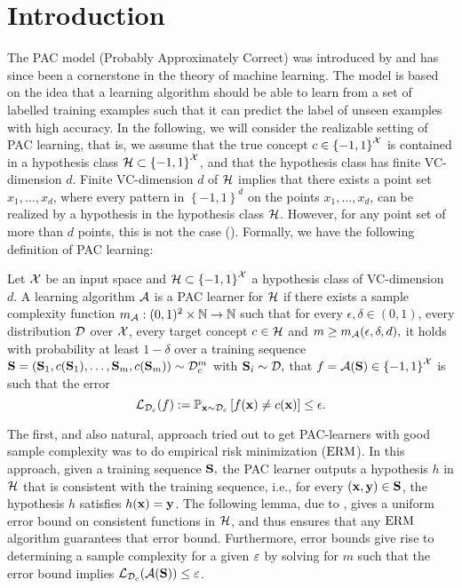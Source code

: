 

\section{Introduction}
The PAC model (Probably Approximately Correct) was introduced by \cite{valiant1984theory,vapnik1964class,vapnik74theory} and has since been a cornerstone in the theory of machine learning. The model is based on the idea that a learning algorithm should be able to learn from a set of labelled training examples such that it can predict the label of unseen examples with high accuracy. In the following, we will consider the realizable setting of PAC learning, that is, we assume that the true concept $ c\in\left\{ -1,1 \right\}^{\mathcal{X}} $  is contained in a hypothesis class $ \mathcal{H} \subset \left\{ -1,1 \right\}^{\mathcal{X}}$, and that the hypothesis class has finite VC-dimension $ d $. Finite VC-dimension $ d $ of $ \mathcal{H} $ implies that there exists a point set $ x_1,\ldots,x_{d} $, where every pattern in $ \left\{ -1,1 \right\}^{d} $ on the points $ x_{1},\ldots,x_{d} $, can be realized by a hypothesis in the hypothesis class $ \mathcal{H} $. However, for any point set of more than $ d $ points, this is not the case (\cite{vapnik1971uniform}). Formally, we have the following definition of PAC learning:
\begin{definition}
    Let $\mathcal{X}$ be an input space and $\mathcal{H}\subset \left\{ -1,1 \right\}^{\mathcal{X}}$ a hypothesis class of VC-dimension $ d.$ A learning algorithm $\mathcal{A}$ is a PAC learner for $\mathcal{H}$ if there exists a sample complexity function $m_{\mathcal{A}}:(0,1)^{2}\times \mathbb{N}\rightarrow\mathbb{N}$ such that for every $\epsilon,\delta\in(0,1)$, every distribution $\mathcal{D}$ over $\mathcal{X}$, every target concept $ c\in \mathcal{H} $ and $m\geq m_{\mathcal{A}}(\epsilon,\delta,d),$ it holds with probability at least $1-\delta$ over a training sequence $\mathbf{S}=(\mathbf{S}_1,c(\mathbf{S}_1),\ldots,\mathbf{S}_{m},c(\mathbf{S}_{m}))\sim\mathcal{D}_{c}^{m}$ with $\mathbf{S}_{i} \sim\mathcal{D} ,$ that $ f=\mathcal{A}(\mathbf{S}) \in\left\{ -1,1 \right\}^{\mathcal{X}}$ is such that the error $$\operatorname{\mathcal{L}}_{\mathcal{D}_{c}}(f):=\mathbb{P}_{\mathbf{x}\sim \mathcal{D}_{c}}\left[f(\mathbf{x})\not=c(\mathbf{x})\right]\leq\epsilon.$$
\end{definition}
The first, and also natural, approach tried out to get PAC-learners with good sample complexity was to do empirical risk minimization ($\mathrm{ERM}$). In this approach, given a training sequence $   \mathbf{S}, $ the PAC learner outputs a hypothesis $ h $  in $ \mathcal{H} $ that is consistent with the training sequence, i.e., for every $ (\mathbf{x},\mathbf{y})\in \mathbf{S} $, the hypothesis $ h $ satisfies $ h(\mathbf{x})=\mathbf{y} $. The following lemma, due to \cite{vapnik1968algorithms,vapnik1971uniform,blumer1989learnability}, gives a uniform error bound on consistent functions in $ \mathcal{H}$, and thus ensures that any $ \mathrm{ERM} $ algorithm guarantees that error bound. Furthermore, error bounds give rise to determining a sample complexity for a given $ \varepsilon $ by solving for $ m $ such that the error bound implies $ \operatorname{\mathcal{L}}_{\mathcal{D}_{c}}(\mathcal{A}(\mathbf{S}))\leq \varepsilon $.

